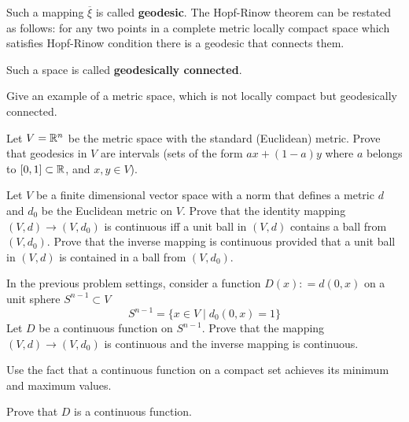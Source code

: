 \documentclass[12pt]{article}
\begin{document}
\begin{zamechanie} Such a mapping $\overline\xi$ 
is called {\bf geodesic}. The
  Hopf-Rinow theorem can be restated as follows: for any two points in
  a complete metric locally compact space which satisfies Hopf-Rinow
  condition there is a geodesic that connects them.
\end{zamechanie}

\begin{opredelenie} 
Such a space is called {\bf geodesically connected}.
\end{opredelenie}

\begin{zadacha}[*] Give an example of a metric space,
which is not locally compact but geodesically connected.
\end{zadacha}

\begin{zadacha} Let $V= {\mathbb R}^n$ be the metric space with the standard
  (Euclidean) metric. Prove that geodesics in
  $V$ are intervals (sets of the form $a x + (1-a) y$ where $a$
  belongs to $[0, 1] \subset {\mathbb R}$, and $x, y \in V$).
\end{zadacha}

\begin{zadacha} Let $V$ be a finite dimensional vector space with a
  norm that defines a metric $d$ and $d_0$ be the Euclidean metric on
$V$. Prove that the identity mapping $(V, d) \to (V, d_0)$
is continuous iff a unit ball in $(V, d)$
contains a ball from $(V, d_0)$. Prove that the inverse mapping is
continuous provided that a unit ball in $(V, d)$ 
is contained in a ball from $(V, d_0)$. 
\end{zadacha}

\begin{zadacha} In the previous problem settings,
  consider a function $D(x): = d(0,x)$  on a unit sphere
  $S^{n-1}\subset V $ 
$$
S^{n-1} = \{x\in V \mid d_0(0,x)=1\}
$$
Let $D$ be a continuous function on $S^{n-1}$. Prove that 
the mapping $(V, d) \to (V, d_0)$ is continuous and the inverse
mapping is continuous.
\end{zadacha}

\begin{ukazanie} Use the fact that a continuous function on a compact set 
achieves its
  minimum and maximum values.
\end{ukazanie}

\begin{zadacha}[**] Prove that $D$ is a continuous function.
\end{zadacha}
\end{document}

